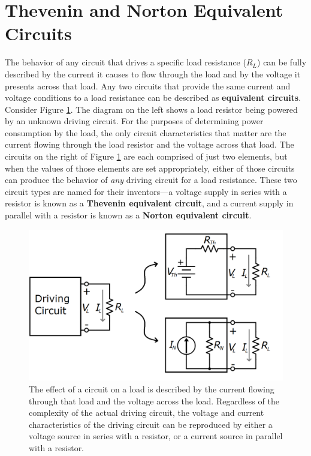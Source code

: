 \section{Thevenin and Norton Equivalent Circuits}
The behavior of any circuit that drives a specific load resistance ($R_L$) can be fully described by the current it causes to flow through the load and by the voltage it presents across that load. Any two circuits that provide the same current and voltage conditions to a load resistance can be described as \textbf{equivalent circuits}. Consider Figure \ref{blackboxDrivingCircuit}. The diagram on the left shows a load resistor being powered by an unknown driving circuit. For the purposes of determining power consumption by the load, the only circuit characteristics that matter are the current flowing through the load resistor and the voltage across that load. The circuits on the right of Figure \ref{blackboxDrivingCircuit} are each comprised of just two elements, but when the values of those elements are set appropriately, either of those circuits can produce the behavior of \textit{any} driving circuit for a load resistance. These two circuit types are named for their inventors---a voltage supply in series with a resistor is known as a \textbf{Thevenin equivalent circuit}, and a current supply in parallel with a resistor is known as a \textbf{Norton equivalent circuit}. 
\begin{figure}[h!]
\centering
\includegraphics[width=13cm]{figures/blackboxDrivingToEquivalents.png}
\caption{The effect of a circuit on a load is described by the current flowing through that load and the voltage across the load. Regardless of the complexity of the actual driving circuit, the voltage and current characteristics of the driving circuit can be reproduced by either a voltage source in series with a resistor, or a current source in parallel with a resistor.}
\label{blackboxDrivingCircuit}
\end{figure}
